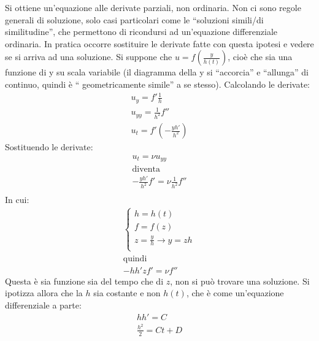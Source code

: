 Si ottiene un'equazione alle derivate parziali, non ordinaria. 
Non ci sono regole generali di soluzione, solo casi particolari come le ``soluzioni simili/di similitudine'', che permettono di ricondursi ad un'equazione differenziale ordinaria.
In pratica occorre sostituire le derivate fatte con questa ipotesi e vedere se si arriva ad una soluzione.
Si suppone che $u = f \left( \frac{y}{h(t)} \right)$, cioè che sia una funzione di y su scala variabile (il diagramma della y si ``accorcia'' e ``allunga'' di continuo, quindi è `` geometricamente simile'' a se stesso).
Calcolando le derivate:
%
	\begin{equation*}
		\begin{gathered}
			u_y = f' \frac{1}{h}\\
			u_{yy} = \frac{1}{h^2} f''\\
			u_t = f' \left( - \frac{y h'}{h^2} \right)
		\end{gathered}
	\end{equation*}
%	
Sostituendo le derivate:
%
	\begin{equation*}
		\begin{gathered}
			u_t  = \nu u_{yy}\\
			\text{diventa}\\
			- \frac{y h'}{h^2} f' = \nu \frac{1}{h^2} f''\\
		\end{gathered}
	\end{equation*}
%			
In cui:			
%
	\begin{equation*}
		\begin{gathered}
			\left\{
				\begin{aligned}
					h = h(t)\\
					f = f(z)\\
					z = \frac{y}{h} \rightarrow y = zh\\
				\end{aligned}
			\right.\\
			\text{quindi}\\
			-h h' z f' = \nu f''
		\end{gathered}
	\end{equation*}
%
Questa è sia funzione sia del tempo che di $z$, non si può trovare una soluzione.
Si ipotizza allora che la $h$ sia costante e non $h(t)$, che è come un'equazione differenziale a parte:
%
	\begin{equation*}
		\begin{gathered}
			h h' = C\\
			\frac{h^2}{2} = C t + D\\
		\end{gathered}
	\end{equation*}
